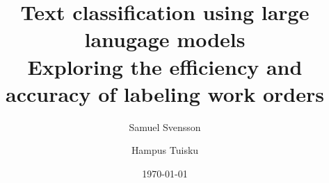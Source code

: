 \documentclass{article}
\title{
    Text classification using large lanugage models
    \\ \large
    Exploring the efficiency and accuracy of labeling work orders
}
\author{Samuel Svensson \and Hampus Tuisku}
\date{\today}
\begin{document}
\maketitle
\newpage

\tableofcontents
\newpage





\pagebreak


\end{document}
